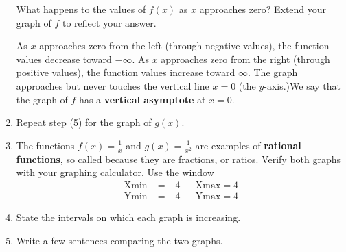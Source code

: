 \documentclass[10pt,]{book}
\newcommand{\terminology}[1]{\textbf{#1}}
\theoremstyle{plain}
\theoremstyle{definition}
\theoremstyle{definition}
\numberwithin{equation}{section}
\newcommand{\hrulethin}  {\noalign{\hrule height 0.04em}}
\newcommand{\hrulethick} {\noalign{\hrule height 0.11em}}
\newcounter{figstack}
\newcounter{figindex}
\newlength\fight
\newcommand\pushValignCaptionBottom[5][b]{%
\stepcounter{figstack}%
\expandafter\def\csname %
figalign\romannumeral\value{figstack}\endcsname{#1}%
\expandafter\def\csname %
figtype\romannumeral\value{figstack}\endcsname{#2}%
\expandafter\def\csname %
figwd\romannumeral\value{figstack}\endcsname{#3}%
\expandafter\def\csname %
figcontent\romannumeral\value{figstack}\endcsname{#4}%
\expandafter\def\csname %
figcap\romannumeral\value{figstack}\endcsname{#5}%
\setbox0=\hbox{%
\begin{#2}{#3}#4\end{#2}}%
\ifdim\dimexpr\ht0+\dp0\relax>\fight\global\setlength{\fight}{%
\dimexpr\ht0+\dp0\relax}\fi%
}
\newcommand\popValignCaptionBottom{%
\setcounter{figindex}{0}%
\hfill%
\whiledo{\value{figindex}<\value{figstack}}{%
\stepcounter{figindex}%
\def\tmp{\csname figwd\romannumeral\value{figindex}\endcsname}%
\begin{\csname figtype\romannumeral\value{figindex}\endcsname}[t]{\tmp}%
\centering%
\stackinset{c}{}%
{\csname figalign\romannumeral\value{figindex}\endcsname}{}%
{\csname figcontent\romannumeral\value{figindex}\endcsname}%
{\rule{0pt}{\fight}}\par%
\csname figcap\romannumeral\value{figindex}\endcsname%
\end{\csname figtype\romannumeral\value{figindex}\endcsname}%
\hfill%
}%
\setcounter{figstack}{0}%
\setlength{\fight}{0pt}%
\hfill%
}
\newcommand{\amp}{ & }
\begin{document}
\begin{enumerate}
    \leavevmode%
What happens to the values of \(f (x)\) as \(x\) approaches zero? Extend your graph of \(f\) to reflect your answer.%
\par
As \(x\) approaches zero from the left (through negative values), the function values decrease toward \(-\infty\). As \(x\) approaches zero from the right (through positive values), the function values increase toward \(\infty\). The graph approaches but never touches the vertical line \(x = 0\) (the \(y\)-axis.)We say that the graph of \(f\) has a \terminology{vertical asymptote} at \(x = 0\).%
\item\hypertarget{li-272}{}
        Repeat step (5) for the graph of \(g(x)\).
    \item\hypertarget{li-273}{}
        The functions \(f (x) = \frac{1}{x}\) and \(g(x) = \frac{1}{x^2}\) are examples of \terminology{rational functions}, so called because they are fractions, or ratios. Verify both graphs with your graphing calculator. Use the window
        \begin{align}
        \text{Xmin} \amp = −4 \amp\amp \text{Xmax} = 4\\
        \text{Ymin} \amp = −4 \amp\amp \text{Ymax} = 4
        \end{align}
    \item\hypertarget{li-274}{}
        State the intervals on which each graph is increasing.
    \item\hypertarget{li-275}{}
        Write a few sentences comparing the two graphs.
    \end{enumerate}
\end{document}
